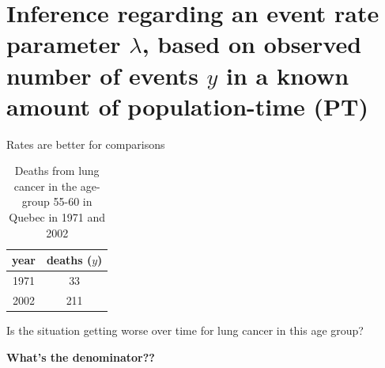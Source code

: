 \documentclass[10pt,handout]{beamer}\usepackage[]{graphicx}\usepackage[]{color}
\begin{document}
\section{Inference regarding an event rate parameter $\lambda$, based on observed number of events $y$ in a known amount of population-time (PT)}

\begin{frame}{Rates are better for comparisons}
	
	
	\begin{table}
		\centering
		\begin{tabular}{cc}
			year & deaths ($y$) \\
			\hline
			1971 & 33 \\
			2002 & 211 \\
			\hline
		\end{tabular}
		\caption{Deaths from lung cancer in the age-group 55-60 in Quebec in 1971 and 2002}
	\end{table} 
	
	\pause 
	
	 Is the situation getting worse over time for lung cancer in this age group?
	\pause
	
	\vspace*{0.5in}
	
	 \textbf{What's the denominator??}
	
	
\end{frame} 



\begin{frame}
\end{frame}
\end{document}
